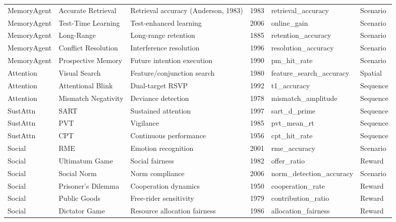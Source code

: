 \documentclass[10pt,landscape]{article}
\begin{document}
\begin{longtable}{@{}p{2.3cm}p{3.0cm}p{4.5cm}p{0.6cm}p{3.8cm}p{1.8cm}@{}}
\midrule
MemoryAgent & Accurate Retrieval & Retrieval accuracy (Anderson, 1983) & 1983 & retrieval\_accuracy & Scenario \\
MemoryAgent & Test-Time Learning & Test-enhanced learning & 2006 & online\_gain & Scenario \\
MemoryAgent & Long-Range & Long-range retention & 1885 & retention\_accuracy & Scenario \\
MemoryAgent & Conflict Resolution & Interference resolution & 1996 & resolution\_accuracy & Scenario \\
MemoryAgent & Prospective Memory & Future intention execution & 1990 & pm\_hit\_rate & Scenario \\

\midrule
Attention & Visual Search & Feature/conjunction search & 1980 & feature\_search\_accuracy & Spatial \\
Attention & Attentional Blink & Dual-target RSVP & 1992 & t1\_accuracy & Sequence \\
Attention & Mismatch Negativity & Deviance detection & 1978 & mismatch\_amplitude & Sequence \\

\midrule
SustAttn & SART & Sustained attention \citep{robertson1997sustained} & 1997 & sart\_d\_prime & Sequence \\
SustAttn & PVT & Vigilance & 1985 & pvt\_mean\_rt & Sequence \\
SustAttn & CPT & Continuous performance & 1956 & cpt\_hit\_rate & Sequence \\

\midrule
Social & RME & Emotion recognition \citep{baroncohen2001eyes} & 2001 & rme\_accuracy & Scenario \\
Social & Ultimatum Game & Social fairness \citep{guth1982experimental} & 1982 & offer\_ratio & Reward \\
Social & Social Norm & Norm compliance & 2006 & norm\_detection\_accuracy & Scenario \\
Social & Prisoner's Dilemma & Cooperation dynamics & 1950 & cooperation\_rate & Reward \\
Social & Public Goods & Free-rider sensitivity & 1979 & contribution\_ratio & Reward \\
Social & Dictator Game & Resource allocation fairness & 1986 & allocation\_fairness & Reward \\


\end{longtable}
\end{document}
